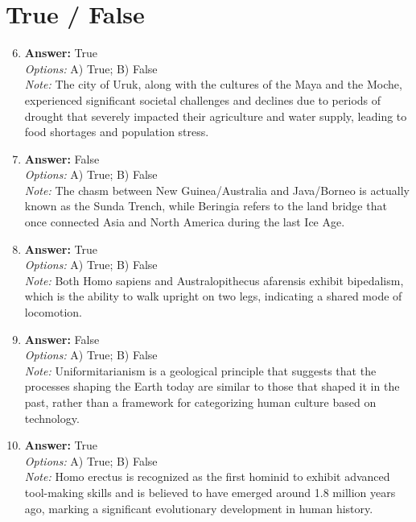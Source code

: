 \documentclass[12pt]{article}
\begin{document}
\section*{True / False}
\begin{enumerate}[label=\arabic*.]
\setcounter{enumi}{5}
\item \textbf{Answer:} True
\\ \textit{Options:} A) True; B) False
\\ \textit{Note:} The city of Uruk, along with the cultures of the Maya and the Moche, experienced significant societal challenges and declines due to periods of drought that severely impacted their agriculture and water supply, leading to food shortages and population stress.
\item \textbf{Answer:} False
\\ \textit{Options:} A) True; B) False
\\ \textit{Note:} The chasm between New Guinea/Australia and Java/Borneo is actually known as the Sunda Trench, while Beringia refers to the land bridge that once connected Asia and North America during the last Ice Age.
\item \textbf{Answer:} True
\\ \textit{Options:} A) True; B) False
\\ \textit{Note:} Both Homo sapiens and Australopithecus afarensis exhibit bipedalism, which is the ability to walk upright on two legs, indicating a shared mode of locomotion.
\item \textbf{Answer:} False
\\ \textit{Options:} A) True; B) False
\\ \textit{Note:} Uniformitarianism is a geological principle that suggests that the processes shaping the Earth today are similar to those that shaped it in the past, rather than a framework for categorizing human culture based on technology.
\item \textbf{Answer:} True
\\ \textit{Options:} A) True; B) False
\\ \textit{Note:} Homo erectus is recognized as the first hominid to exhibit advanced tool-making skills and is believed to have emerged around 1.8 million years ago, marking a significant evolutionary development in human history.
\end{enumerate}
\end{document}
